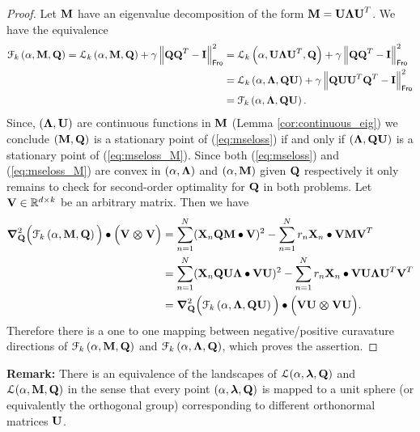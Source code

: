\documentclass[11pt]{article}
\theoremstyle{plain}
\def\R{\mathbb{R}}
\theoremstyle{plain}
\numberwithin{equation}{section}
\numberwithin{lemma}{section}
\numberwithin{theorem}{section}
\numberwithin{corollary}{section}
\numberwithin{observation}{section}
\numberwithin{definition}{section}
\numberwithin{example}{section}
\begin{document}
\begin{proof}
Let $\Mx{M}$ have an eigenvalue decomposition of the form $\Mx{M} = \Mx{U} \Mx{\Lambda} \Mx{U}^T$. We have the equivalence
\begin{align*}
\mathcal{F}_k\left(\alpha, \Mx{M}, \Mx{Q} \right) = \mathcal{L}_k\left(\alpha, \Mx{M}, \Mx{Q} \right)+ \gamma \left\|\Mx{QQ}^T-\Mx{I}\right\|^2_{\sf Fro} &= \mathcal{L}_k\left(\alpha, \Mx{U\Lambda U}^T, \Mx{Q} \right) + \gamma \left\|\Mx{Q}\Mx{Q}^T-\Mx{I}\right\|^2_{\sf Fro}\\
&=  \mathcal{L}_k\left(\alpha, \Mx{\Lambda}, \Mx{QU} \right)+ \gamma \left\|\Mx{QUU}^T\Mx{Q}^T-\Mx{I}\right\|^2_{\sf Fro} \\
&= \mathcal{F}_k\left(\alpha, \Mx{\Lambda}, \Mx{QU} \right).
\end{align*}
Since, $(\Mx{\Lambda}, \Mx{U})$ are continuous functions in $\Mx{M}$ (Lemma \ref{cor:continuous_eig}) we conclude $(\Mx{M},\Mx{Q})$ is a stationary point of (\ref{eq:mseloss}) if and only if $(\Mx{\Lambda},\Mx{QU})$ is a stationary point of (\ref{eq:mseloss_M}). Since both (\ref{eq:mseloss}) and (\ref{eq:mseloss_M}) are convex in $(\alpha,\Mx{\Lambda})$ and $(\alpha,\Mx{M})$ given $\Mx{Q}$ respectively it only remains to check for second-order optimality for $\Mx{Q}$ in both problems. Let $\Mx{V}\in \R^{d \times k}$ be an arbitrary matrix. Then we have
\begin{align*}
    \Mx{\nabla}^2_{\Mx{Q}}\Big(\mathcal{F}_k\left(\alpha, \Mx{M}, \Mx{Q} \right) \Big) \bullet \Big( \Mx{V \otimes V} \Big) &= \sum_{n=1}^N (\Mx{X}_n \Mx{Q} \Mx{M} \bullet \Mx{V})^2 -\sum_{n=1}^N r_n \Mx{X}_n \bullet \Mx{V} \Mx{M} \Mx{V}^T \\
    &= \sum_{n=1}^N (\Mx{X}_n \Mx{Q} \Mx{U \Lambda} \bullet \Mx{VU})^2 -\sum_{n=1}^N r_n \Mx{X}_n \bullet \Mx{VU} \Mx{\Lambda U}^T \Mx{V}^T \\
    & =  \Mx{\nabla}^2_{\Mx{Q}}\Big(\mathcal{F}_k\left(\alpha, \Mx{\Lambda}, \Mx{QU} \right) \Big) \bullet \Big( \Mx{VU \otimes VU} \Big).
\end{align*}
Therefore there is a one to one mapping between negative/positive curavature directions of  $\mathcal{F}_k\left(\alpha, \Mx{M}, \Mx{Q} \right)$ and $\mathcal{F}_k\left(\alpha, \Mx{\Lambda}, \Mx{Q} \right)$, which proves the assertion.


\end{proof}

\noindent \textbf{Remark:} There is an equivalence of the landscapes of $\mathcal{L}(\alpha,\V{\lambda},\Mx{Q})$ and $\mathcal{L}(\alpha,\Mx{M},\Mx{Q})$ in the sense that every point $(\alpha,\V{\lambda},\Mx{Q})$ is mapped to a unit sphere (or equivalently the orthogonal group) corresponding to different orthonormal matrices $\Mx{U}$. 
\end{document}
